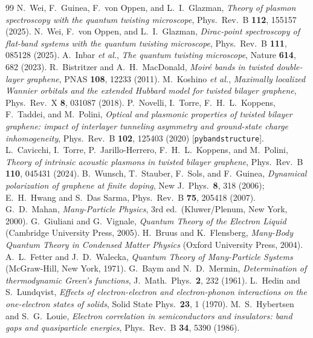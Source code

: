\documentclass[11pt,a4paper]{article}
\theoremstyle{remark}
\begin{document}
\begin{thebibliography}{99}
 N.~Wei, F.~Guinea, F.~von Oppen, and L.~I.~Glazman, \emph{Theory of plasmon spectroscopy with the quantum twisting microscope}, Phys.~Rev.~B \textbf{112}, 155157 (2025).
 N.~Wei, F.~von Oppen, and L.~I.~Glazman, \emph{Dirac-point spectroscopy of flat-band systems with the quantum twisting microscope}, Phys.~Rev.~B \textbf{111}, 085128 (2025).
 A.~Inbar \emph{et al.}, \emph{The quantum twisting microscope}, Nature \textbf{614}, 682 (2023).
 R.~Bistritzer and A.~H.~MacDonald, \emph{Moir\'e bands in twisted double-layer graphene}, PNAS \textbf{108}, 12233 (2011).
 M.~Koshino \emph{et al.}, \emph{Maximally localized Wannier orbitals and the extended Hubbard model for twisted bilayer graphene}, Phys.~Rev.~X \textbf{8}, 031087 (2018).
 P.~Novelli, I.~Torre, F.~H.~L.~Koppens, F.~Taddei, and M.~Polini, \emph{Optical and plasmonic properties of twisted bilayer graphene: impact of interlayer tunneling asymmetry and ground-state charge inhomogeneity}, Phys.~Rev.~B \textbf{102}, 125403 (2020) [\texttt{pybandstructure}].
 L.~Cavicchi, I.~Torre, P.~Jarillo-Herrero, F.~H.~L.~Koppens, and M.~Polini, \emph{Theory of intrinsic acoustic plasmons in twisted bilayer graphene}, Phys.~Rev.~B \textbf{110}, 045431 (2024).
 B.~Wunsch, T.~Stauber, F.~Sols, and F.~Guinea, \emph{Dynamical polarization of graphene at finite doping}, New J.~Phys.~\textbf{8}, 318 (2006); E.~H.~Hwang and S.~Das Sarma, Phys.~Rev.~B \textbf{75}, 205418 (2007).
 G.~D.~Mahan, \emph{Many-Particle Physics}, 3rd ed.\ (Kluwer/Plenum, New York, 2000).
 G.~Giuliani and G.~Vignale, \emph{Quantum Theory of the Electron Liquid} (Cambridge University Press, 2005).
 H.~Bruus and K.~Flensberg, \emph{Many-Body Quantum Theory in Condensed Matter Physics} (Oxford University Press, 2004).
 A.~L.~Fetter and J.~D.~Walecka, \emph{Quantum Theory of Many-Particle Systems} (McGraw-Hill, New York, 1971).
 G.~Baym and N.~D.~Mermin, \emph{Determination of thermodynamic Green's functions}, J.~Math.~Phys.~\textbf{2}, 232 (1961).
 L.~Hedin and S.~Lundqvist, \emph{Effects of electron-electron and electron-phonon interactions on the one-electron states of solids}, Solid State Phys.~\textbf{23}, 1 (1970).
 M.~S.~Hybertsen and S.~G.~Louie, \emph{Electron correlation in semiconductors and insulators: band gaps and quasiparticle energies}, Phys.~Rev.~B \textbf{34}, 5390 (1986).

\end{thebibliography}
\end{document}
